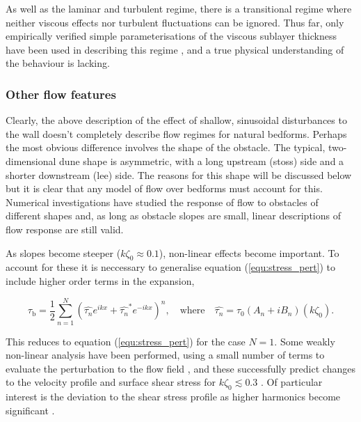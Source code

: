 \documentclass[12pt]{article}
\begin{document}
As well as the laminar and turbulent regime, there is a transitional regime where neither viscous effects nor turbulent fluctuations can be ignored. Thus far, only empirically verified simple parameterisations of the viscous sublayer thickness have been used in describing this regime \citep{Abrams85, Frederick88}, and a true physical understanding of the behaviour is lacking.


\subsubsection{Other flow features}
\label{subsubsec:other_flow}

Clearly, the above description of the effect of shallow, sinusoidal disturbances to the wall doesn't completely describe flow regimes for natural bedforms. Perhaps the most obvious difference involves the shape of the obstacle. The typical, two-dimensional dune shape is asymmetric, with a long upstream (stoss) side and a shorter downstream (lee) side. The reasons for this shape will be discussed below but it is clear that any model of flow over bedforms must account for this. Numerical investigations have studied the response of flow to obstacles of different shapes \citep{Richards81, Yue06} and, as long as obstacle slopes are small, linear descriptions of flow response are still valid. 

As slopes become steeper ($k \zeta_{0} \approx 0.1$), non-linear effects become important. To account for these it is neccessary to generalise equation (\ref{equ:stress_pert}) to include higher order terms in the expansion,

\begin{equation}
\label{equ:gen_shear_stress}
\tau_{\text{b}} = \frac{1}{2} \sum_{n = 1}^{N} (\hat{\tau_{n}} e^{i k x} + \hat{\tau_{n}}^{*} e^{-i k x})^{n}, \quad \text{where} \quad \hat{\tau_{n}} = \tau_{0}(A_{n} + i B_{n}) (k \zeta_{0}).
\end{equation}

This reduces to equation (\ref{equ:stress_pert}) for the case $N = 1$. Some weakly non-linear analysis have been performed, using a small number of terms to evaluate the perturbation to the flow field \citep{Caponi82, Andreotti09}, and these successfully predict changes to the velocity profile and surface shear stress for $k \zeta_{0} \lesssim 0.3$ \citep{Kuzan89}. Of particular interest is the deviation to the shear stress profile as higher harmonics become significant \citep{Zilker77, Richards81}. 
\end{document}
